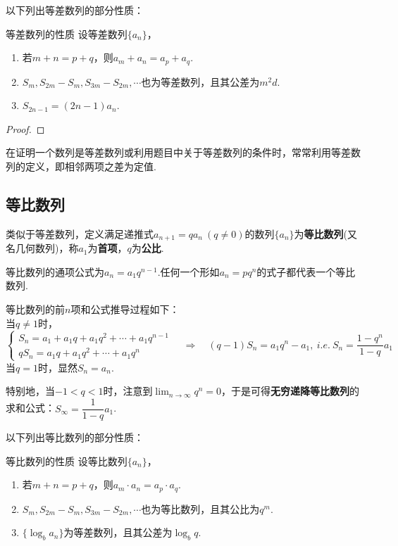 \documentclass[lang=cn, zihao=5]{elegantbook}
\begin{document}
以下列出等差数列的部分性质：

\begin{proposition}{等差数列的性质}
	设等差数列$\{ a_n \}$，
	\begin{enumerate}
		\item 若$m+n=p+q$，则$a_m+a_n=a_p+a_q$.
		\item $S_m,S_{2m}-S_m,S_{3m}-S_{2m},\cdots $也为等差数列，且其公差为$m^2d$.
		\item $S_{2n-1}=(2n-1)a_n$.
	\end{enumerate}
\end{proposition}
\begin{proof}
\end{proof}

在证明一个数列是等差数列或利用题目中关于等差数列的条件时，常常利用等差数列的定义，即相邻两项之差为定值.

\subsection{等比数列}

类似于等差数列，定义满足递推式$a_{n+1}=qa_n ~(q \neq 0)$的数列$\{ a_n \}$为\textbf{等比数列}(又名几何数列)，称$a_1$为\textbf{首项}，$q$为\textbf{公比}.

等比数列的通项公式为$a_n = a_1 q^{n-1}$.任何一个形如$a_n=pq^n$的式子都代表一个等比数列.

等比数列的前$n$项和公式推导过程如下： \\
当$q \neq 1$时，
$$\begin{cases}
	S_n = a_1 + a_1q + a_1q^2 + \cdots + a_1q^{n-1} \\
	qS_n = a_1q + a_1q^2 + \cdots + a_1q^{n} 
\end{cases}
\quad \Longrightarrow \quad
(q-1)S_n = a_1q^{n} - a_1,~i.e.~S_n = \frac{1-q^n}{1-q} a_1
$$
当$q = 1$时，显然$S_n = a_n$.

特别地，当$-1<q<1$时，注意到$\lim _{n \to \infty} q^n=0$，于是可得\textbf{无穷递降等比数列}的求和公式：$S_{\infty} = \dfrac{1}{1-q}a_1$.

以下列出等比数列的部分性质：

\begin{proposition}{等比数列的性质}
	设等比数列$\{ a_n \}$，
	\begin{enumerate}
		\item 若$m+n=p+q$，则$a_m \cdot a_n = a_p \cdot a_q$.
		\item $S_m,S_{2m}-S_m,S_{3m}-S_{2m},\cdots $也为等比数列，且其公比为$q^{m}$.
		\item $\{ \log _{b}{a_n} \}$为等差数列，且其公差为$\log _{b}{q}$.
	\end{enumerate}
\end{proposition}
\end{document}
